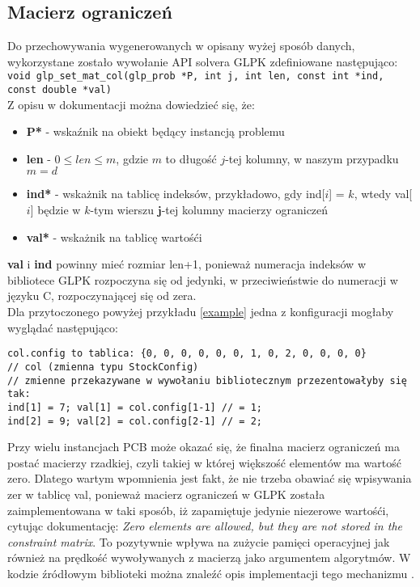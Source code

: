 \subsection{Macierz ograniczeń} \label{macierz_ograniczen}
Do przechowywania wygenerowanych w opisany wyżej sposób danych, wykorzystane zostało wywołanie API solvera GLPK zdefiniowane następująco: \\
\verb|void glp_set_mat_col(glp_prob *P, int j, int len, const int *ind, const double *val)| \\
Z opisu w dokumentacji \cite{GLPK_DOCS} można dowiedzieć się, że:
\begin{itemize}
	\item \textbf{P*} - wskaźnik na obiekt będący instancją problemu
	\item \textbf{len} - $0 \leq len \leq m$, gdzie $m$ to długość $j$-tej kolumny, w naszym przypadku $m = d$
	\item \textbf{ind*} - wskażnik na tablicę indeksów, przykładowo, gdy ind[$i$] = $k$, wtedy val[$i$] będzie w $k$-tym wierszu $\mathbf{j}$-tej kolumny macierzy ograniczeń
	\item \textbf{val*} - wskażnik na tablicę wartośći
\end{itemize}
\textbf{val} i \textbf{ind} powinny mieć rozmiar len+1, ponieważ numeracja indeksów w bibliotece GLPK rozpoczyna się od jedynki, w przeciwieństwie do numeracji w języku C, rozpoczynającej się od zera. \\

Dla przytoczonego powyżej przykładu \ref{example} jedna z konfiguracji mogłaby wyglądać następująco:

\begin{lstlisting}
col.config to tablica: {0, 0, 0, 0, 0, 0, 1, 0, 2, 0, 0, 0, 0}            
// col (zmienna typu StockConfig)	
// zmienne przekazywane w wywołaniu bibliotecznym przezentowałyby się tak: 
ind[1] = 7; val[1] = col.config[1-1] // = 1; 
ind[2] = 9; val[2] = col.config[2-1] // = 2; 
\end{lstlisting}


Przy wielu instancjach PCB może okazać się, że finalna macierz ograniczeń ma postać macierzy rzadkiej, czyli takiej w której większość elementów ma wartość zero. Dlatego wartym wpomnienia jest fakt, że nie trzeba obawiać się wpisywania zer w tablicę val, ponieważ macierz ograniczeń w GLPK została zaimplementowana w taki sposób, iż zapamiętuje jedynie niezerowe wartośći, cytując dokumentację: \textit{Zero elements are allowed, but they are not stored in the constraint matrix}. To pozytywnie wpływa na zużycie pamięci operacyjnej jak również na prędkość wywoływanych z macierzą jako argumentem algorytmów. W kodzie źródłowym biblioteki można znaleźć opis implementacji tego mechanizmu \cite{GLPK_SRC}.

